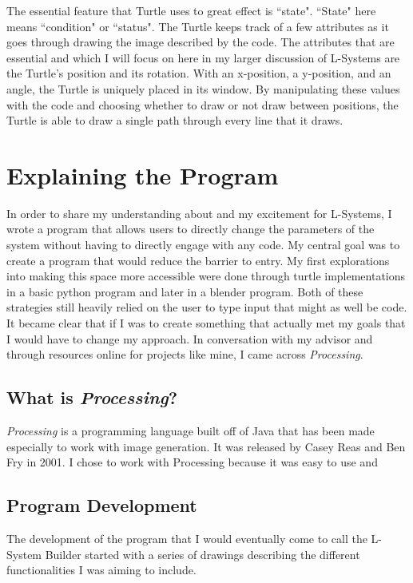 \documentclass[12pt,twoside]{reedthesis}
\begin{document}
	The essential feature that Turtle uses to great effect is ``state". ``State" here means ``condition" or ``status". The Turtle keeps track of a few attributes as it goes through drawing the image described by the code. The attributes that are essential and which I will focus on here in my larger discussion of L-Systems are the Turtle's position and its rotation. With an x-position, a y-position, and an angle, the Turtle is uniquely placed in its window. By manipulating these values with the code and choosing whether to draw or not draw between positions, the Turtle is able to draw a single path through every line that it draws.\\


\chapter{Explaining the Program}

	In order to share my understanding about and my excitement for L-Systems, I wrote a program that allows users to directly change the parameters of the system without having to directly engage with any code. My central goal was to create a program that would reduce the barrier to entry. My first explorations into making this space more accessible were done through turtle implementations in a basic python program and later in a blender program. Both of these strategies still heavily relied on the user to type input that might as well be code. It became clear that if I was to create something that actually met my goals that I would have to change my approach. In conversation with my advisor and through resources online for projects like mine, I came across \textit{Processing}.\\

\section{What is \textit{Processing}?}

	\textit{Processing} is a programming language built off of Java that has been made especially to work with image generation. It was released by Casey Reas and Ben Fry in 2001. I chose to work with Processing because it was easy to use and\\

\section{Program Development}
	The development of the program that I would eventually come to call the L-System Builder started with a series of drawings describing the different functionalities I was aiming to include.\\
\end{document}
